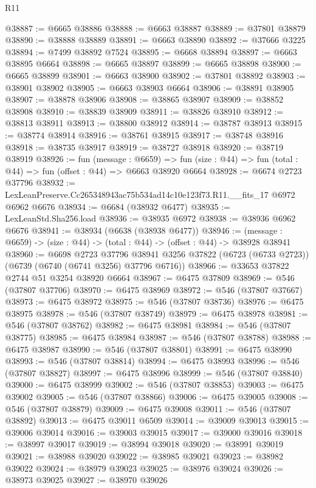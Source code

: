 \begin{lexlean}{R11}
\begin{coremodule}
@38887 := @6665 @38886
@38888 := @6663 @38887
@38889 := @37801 @38879
@38890 := @38888 @38889
@38891 := @6663 @38890
@38892 := @37666 @3225
@38894 := @7499 @38892 @7524
@38895 := @6668 @38894
@38897 := @6663 @38895 @6664
@38898 := @6665 @38897
@38899 := @6665 @38898
@38900 := @6665 @38899
@38901 := @6663 @38900
@38902 := @37801 @38892
@38903 := @38901 @38902
@38905 := @6663 @38903 @6664
@38906 := @38891 @38905
@38907 := @38878 @38906
@38908 := @38865 @38907
@38909 := @38852 @38908
@38910 := @38839 @38909
@38911 := @38826 @38910
@38912 := @38813 @38911
@38913 := @38800 @38912
@38914 := @38787 @38913
@38915 := @38774 @38914
@38916 := @38761 @38915
@38917 := @38748 @38916
@38918 := @38735 @38917
@38919 := @38727 @38918
@38920 := @38719 @38919
@38926 := fun (message : @6659) =>
  fun (size : @44) => fun (total : @44) => fun (offset : @44) => @6663 @38920 @6664
@38928 := @6674 @2723 @37796
@38932 := LexLeanPreserve.Cc265348943ac75b534ad14c10e123f73.R11.__fits_17 @6972 @6962 @6676
@38934 := @6684 (@38932 @6477)
@38935 := LexLeanStd.Sha256.load
@38936 := @38935 @6972
@38938 := @38936 @6962 @6676
@38941 := @38934 (@6638 (@38938 @6477))
@38946 := (message : @6659) -> (size : @44) -> (total : @44) -> (offset : @44) -> @38928 @38941
@38960 := @6698
    @2723
    @37796
    @38941
    @3256
    @37822
    (@6723 (@6733 @2723))
    (@6739 (@6740 (@6741 @3256) @37796 @6716))
@38966 := @33653 @37822 @2744 @51 @3254 @38920 @6664
@38967 := @6475 @37809
@38969 := @546 (@37807 @37706)
@38970 := @6475 @38969
@38972 := @546 (@37807 @37667)
@38973 := @6475 @38972
@38975 := @546 (@37807 @38736)
@38976 := @6475 @38975
@38978 := @546 (@37807 @38749)
@38979 := @6475 @38978
@38981 := @546 (@37807 @38762)
@38982 := @6475 @38981
@38984 := @546 (@37807 @38775)
@38985 := @6475 @38984
@38987 := @546 (@37807 @38788)
@38988 := @6475 @38987
@38990 := @546 (@37807 @38801)
@38991 := @6475 @38990
@38993 := @546 (@37807 @38814)
@38994 := @6475 @38993
@38996 := @546 (@37807 @38827)
@38997 := @6475 @38996
@38999 := @546 (@37807 @38840)
@39000 := @6475 @38999
@39002 := @546 (@37807 @38853)
@39003 := @6475 @39002
@39005 := @546 (@37807 @38866)
@39006 := @6475 @39005
@39008 := @546 (@37807 @38879)
@39009 := @6475 @39008
@39011 := @546 (@37807 @38892)
@39013 := @6475 @39011 @6509
@39014 := @39009 @39013
@39015 := @39006 @39014
@39016 := @39003 @39015
@39017 := @39000 @39016
@39018 := @38997 @39017
@39019 := @38994 @39018
@39020 := @38991 @39019
@39021 := @38988 @39020
@39022 := @38985 @39021
@39023 := @38982 @39022
@39024 := @38979 @39023
@39025 := @38976 @39024
@39026 := @38973 @39025
@39027 := @38970 @39026

\end{coremodule}
\end{lexlean}
